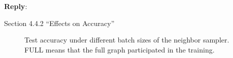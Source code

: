 \documentclass[12pt]{article}
\newenvironment{myquote}[1]%
{\vspace{0.5em}\begin{zitat}{#1}}
{\end{zitat}\vspace{0.5em}}
\newenvironment{reply}
   {\medskip \noindent \textbf{Reply}:\  }
   {\medskip}
\begin{document}
\begin{reply}
\begin{myquote}{Section 4.4.2 ``Effects on Accuracy''}
    \begin{figure}[H]
        \centering
        \caption{Test accuracy under different batch sizes of the neighbor sampler. FULL means that the full graph participated in the training.}
        \label{fig:exp_sampling_relative_batch_size_accuracy_graphsage}
    \end{figure}
    

\end{myquote}
\end{reply}
\end{document}
